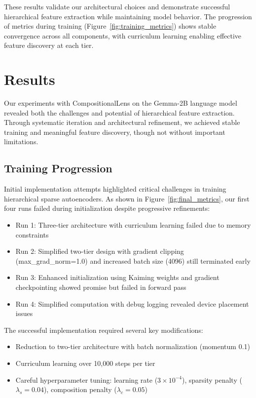 \documentclass{article} %
\begin{document}
These results validate our architectural choices and demonstrate successful hierarchical feature extraction while maintaining model behavior. The progression of metrics during training (Figure~\ref{fig:training_metrics}) shows stable convergence across all components, with curriculum learning enabling effective feature discovery at each tier.


\section{Results}
\label{sec:results}

Our experiments with CompositionalLens on the Gemma-2B language model revealed both the challenges and potential of hierarchical feature extraction. Through systematic iteration and architectural refinement, we achieved stable training and meaningful feature discovery, though not without important limitations.

\subsection{Training Progression}
Initial implementation attempts highlighted critical challenges in training hierarchical sparse autoencoders. As shown in Figure~\ref{fig:final_metrics}, our first four runs failed during initialization despite progressive refinements:

\begin{itemize}
    \item Run 1: Three-tier architecture with curriculum learning failed due to memory constraints
    \item Run 2: Simplified two-tier design with gradient clipping (max\_grad\_norm=1.0) and increased batch size (4096) still terminated early
    \item Run 3: Enhanced initialization using Kaiming weights and gradient checkpointing showed promise but failed in forward pass
    \item Run 4: Simplified computation with debug logging revealed device placement issues
\end{itemize}

The successful implementation required several key modifications:
\begin{itemize}
    \item Reduction to two-tier architecture with batch normalization (momentum 0.1)
    \item Curriculum learning over 10,000 steps per tier
    \item Careful hyperparameter tuning: learning rate ($3\times10^{-4}$), sparsity penalty ($\lambda_s=0.04$), composition penalty ($\lambda_c=0.05$)
\end{itemize}
\end{document}
